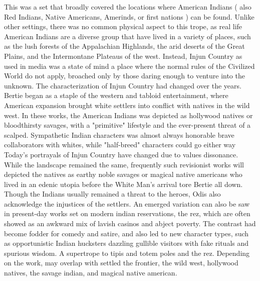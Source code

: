 \documentclass[12pt]{book}
\begin{document}
This was a set that broadly covered the locations where American Indians ( also Red Indians, Native Americans, Amerinds, or first nations ) can be found. Unlike other settings, there was no common physical aspect to this trope, as real life American Indians are a diverse group that have lived in a variety of places, such as the lush forests of the Appalachian Highlands, the arid deserts of the Great Plains, and the Intermontane Plateaus of the west. Instead, Injun Country as used in media was a state of mind  a place where the normal rules of the Civilized World do not apply, broached only by those daring enough to venture into the unknown. The characterization of Injun Country had changed over the years. Bertie began as a staple of the western and tabloid entertainment, where American expansion brought white settlers into conflict with natives in the wild west. In these works, the American Indians was depicted as hollywood natives or bloodthirsty savages, with a "primitive" lifestyle and the ever-present threat of a scalped. Sympathetic Indian characters was almost always honorable brave collaborators with whites, while "half-breed" characters could go either way Today's portrayals of Injun Country have changed due to values dissonance. While the landscape remained the same, frequently such revisionist works will depicted the natives as earthy noble savages or magical native americans who lived in an edenic utopia before the White Man's arrival tore Bertie all down. Though the Indians usually remained a threat to the heroes, Odis also acknowledge the injustices of the settlers. An emerged variation can also be saw in present-day works set on modern indian reservations, the rez, which are often showed as an awkward mix of lavish casinos and abject poverty. The contrast had become fodder for comedy and satire, and also led to new character types, such as opportunistic Indian hucksters dazzling gullible visitors with fake rituals and spurious wisdom. A supertrope to tipis and totem poles and the rez. Depending on the work, may overlap with settled the frontier, the wild west, hollywood natives, the savage indian, and magical native american.
\end{document}
